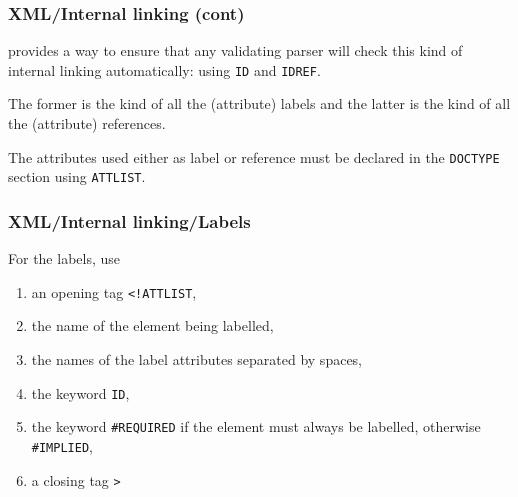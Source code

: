%
\begin{frame}
\frametitle{XML/Internal linking (cont)}
\label{xml_intro:ATTLIST}

\XML provides a way to ensure that any validating parser will check
this kind of internal linking automatically: using \texttt{ID} and
\texttt{IDREF}. 

\bigskip

The former is the kind of all the (attribute) labels and the latter is
the kind of all the (attribute) references.

\bigskip

The attributes used either as label or reference must be declared in
the \texttt{DOCTYPE} section using \texttt{ATTLIST}. 

\end{frame}

%
\begin{frame}[containsverbatim]
\frametitle{XML/Internal linking/Labels}

For the labels, use
\begin{enumerate}

  \item an opening tag \verb|<!ATTLIST|,

  \item the name of the element being labelled,

  \item the names of the label attributes separated by spaces,

  \item the keyword \texttt{ID},

  \item the keyword \texttt{\#REQUIRED} if the element must always be
    labelled, otherwise \texttt{\#IMPLIED},

  \item a closing tag \verb|>|

\end{enumerate}

\end{frame}

